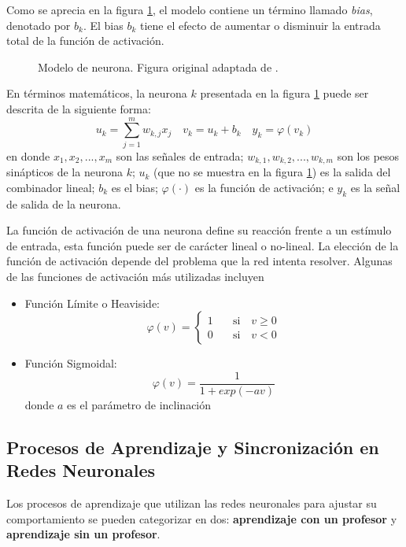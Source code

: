 Como se aprecia en la figura \ref{fig:neuron-model}, el modelo contiene un término llamado \textit{bias}, denotado por $b_k$. El bias $b_k$ tiene el efecto de aumentar o disminuir la entrada total de la función de activación. 

\begin{figure}[H]
    \centering
    \noindent
    \caption{Modelo de neurona. Figura original adaptada de \cite{haykin-2009}. }
    \label{fig:neuron-model}
\end{figure}


En términos matemáticos, la neurona $k$ presentada en la figura \ref{fig:neuron-model} puede ser descrita de la siguiente forma:
$$u_k = \sum_{j=1}^{m} w_{k,j} x_j \quad v_k = u_k + b_k \quad y_k = \varphi(v_k)$$
en donde $x_1, x_2, ..., x_m$ son las señales de entrada; $w_{k,1}, w_{k,2}, ..., w_{k,m}$ son los pesos sinápticos de la neurona $k$; $u_k$ (que no se muestra en la figura \ref{fig:neuron-model}) es la salida del combinador lineal; $b_k$ es el bias; $\varphi(\cdot)$ es la función de activación; e $y_k$ es la señal de salida de la neurona. 

La función de activación de una neurona define su reacción frente a un estímulo de entrada, esta función puede ser de carácter lineal o no-lineal. La elección de la función de activación depende del problema que la red intenta resolver. Algunas de las funciones de activación más utilizadas incluyen
\begin{itemize}
    \item Función Límite o Heaviside:
        $$
        \varphi(v) = \begin{cases}
            1 & \quad \text{si}\quad v \ge 0 \\
            0 & \quad \text{si}\quad v < 0
        \end{cases} 
        $$
    \item Función Sigmoidal:
        $$
        \varphi(v) = \frac{1}{1+exp(-av)}
        $$
        donde $a$ es el parámetro de inclinación
\end{itemize}

\subsection{Procesos de Aprendizaje y Sincronización en Redes Neuronales}
Los procesos de aprendizaje que utilizan las redes neuronales para ajustar su comportamiento se pueden categorizar en dos: \textbf{aprendizaje con un profesor} y \textbf{aprendizaje sin un profesor}.


